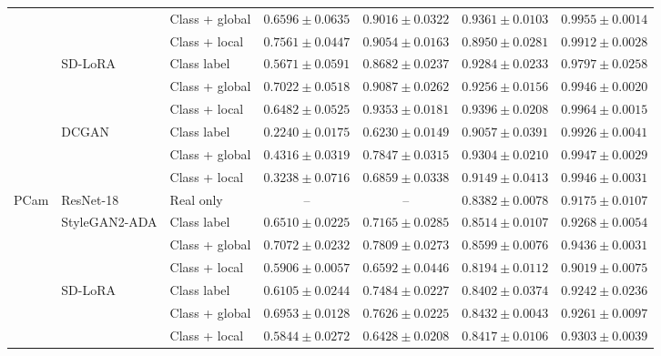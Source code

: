 \begin{table}[htbp]
\begin{tabular}{lllcccc}
 & & Class + global & $0.6596 \pm 0.0635$ & $0.9016 \pm 0.0322$ & $\mathbf{0.9361 \pm 0.0103}$ & $\mathbf{0.9955 \pm 0.0014}$ \\
 & & Class + local  & $\mathbf{0.7561 \pm 0.0447}$ & $\mathbf{0.9054 \pm 0.0163}$ & $0.8950 \pm 0.0281$ & $0.9912 \pm 0.0028$ \\
\cmidrule(lr){2-7}
 & \multirow{3}{*}{SD-LoRA}
 & Class label    & $0.5671 \pm 0.0591$ & $0.8682 \pm 0.0237$ & $0.9284 \pm 0.0233$ & $0.9797 \pm 0.0258$ \\
 & & Class + global & $\mathbf{0.7022 \pm 0.0518}$ & $0.9087 \pm 0.0262$ & $0.9256 \pm 0.0156$ & $0.9946 \pm 0.0020$ \\
 & & Class + local  & $0.6482 \pm 0.0525$ & $\mathbf{0.9353 \pm 0.0181}$ & $\mathbf{0.9396 \pm 0.0208}$ & $\mathbf{0.9964 \pm 0.0015}$ \\
\cmidrule(lr){2-7}
 & \multirow{3}{*}{DCGAN}
 & Class label    & $0.2240 \pm 0.0175$ & $0.6230 \pm 0.0149$ & $0.9057 \pm 0.0391$ & $0.9926 \pm 0.0041$ \\
 & & Class + global & $\mathbf{0.4316 \pm 0.0319}$ & $\mathbf{0.7847 \pm 0.0315}$ & $\mathbf{0.9304 \pm 0.0210}$ & $\mathbf{0.9947 \pm 0.0029}$ \\
 & & Class + local  & $0.3238 \pm 0.0716$ & $0.6859 \pm 0.0338$ & $0.9149 \pm 0.0413$ & $0.9946 \pm 0.0031$ \\
\midrule
\multirow{10}{*}{PCam}
 & ResNet-18 & Real only & -- & -- & $0.8382 \pm 0.0078$ & $0.9175 \pm 0.0107$ \\
\cmidrule(lr){2-7}
 & \multirow{3}{*}{StyleGAN2-ADA}
 & Class label    & $0.6510 \pm 0.0225$ & $0.7165 \pm 0.0285$ & $0.8514 \pm 0.0107$ & $0.9268 \pm 0.0054$ \\
 & & Class + global & $\mathbf{0.7072 \pm 0.0232}$ & $\mathbf{0.7809 \pm 0.0273}$ & $\mathbf{0.8599 \pm 0.0076}$ & $\mathbf{0.9436 \pm 0.0031}$ \\
 & & Class + local  & $0.5906 \pm 0.0057$ & $0.6592 \pm 0.0446$ & $0.8194 \pm 0.0112$ & $0.9019 \pm 0.0075$ \\
\cmidrule(lr){2-7}
 & \multirow{3}{*}{SD-LoRA}
 & Class label    & $0.6105 \pm 0.0244$ & $0.7484 \pm 0.0227$ & $0.8402 \pm 0.0374$ & $0.9242 \pm 0.0236$ \\
 & & Class + global & $\mathbf{0.6953 \pm 0.0128}$ & $\mathbf{0.7626 \pm 0.0225}$ & $\mathbf{0.8432 \pm 0.0043}$ & $0.9261 \pm 0.0097$ \\
 & & Class + local  & $0.5844 \pm 0.0272$ & $0.6428 \pm 0.0208$ & $0.8417 \pm 0.0106$ & $\mathbf{0.9303 \pm 0.0039}$ \\

\end{tabular}
\end{table}
